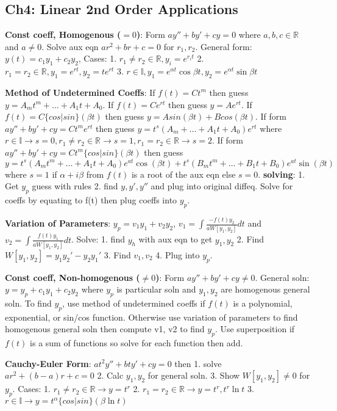\subsection*{Ch4: Linear 2nd Order Applications}

\textbf{Const coeff, Homogenous ($=0$)}:
Form $ay'' + by' + cy = 0$ where $a,b,c \in \mathbb{R}$ and $a \neq 0$. Solve aux eqn $ar^2 + br + c = 0$ for $r_1, r_2$.
General form: $y(t) = c_1 y_1 + c_2 y_2$, 
Cases: 
1. $r_1 \neq r_2 \in \mathbb{R}, y_i = e^{r_i t}$ 
2. $r_1 = r_2 \in \mathbb{R}, y_1 = e^{rt}, y_2 = te^{rt}$ 
3. $r \in \mathbb{I}, y_1 = e^{\alpha t}\cos{\beta t}, y_2 = e^{\alpha t}\sin{\beta t}$

\textbf{Method of Undetermined Coeffs}:
If $f(t) = Ct^m$ then guess $y = A_m t^m + \dots + A_1t + A_0$. 
If $f(t) = Ce^{rt}$ then guess $y = Ae^{rt}$. 
If $f(t) = C\{cos|sin\}(\beta t)$ then guess $y = Asin(\beta t) + Bcos(\beta t)$. 
If form $ay'' + by' + cy = Ct^me^{rt}$ then guess $y = t^s(A_m + \dots + A_1t + A_0)e^{rt}$ 
where $r \in \mathbb{I} \rightarrow s=0, r_1 \neq r_2 \in \mathbb{R} \rightarrow s=1, r_1 = r_2 \in \mathbb{R} \rightarrow s=2$.
If form $ay'' + by' + cy = Ct^m\{cos|sin\}(\beta t)$ then guess $y = t^s(A_m t^m + \dots + A_1t + A_0)e^{at}\cos(\beta t)
+ t^s(B_m t^m + \dots + B_1t + B_0)e^{at}\sin(\beta t)$ where $s=1$ if $\alpha + i \beta$ from $f(t)$ is a root of the aux eqn else $s=0$. \textbf{solving}:
1. Get $y_p$ guess with rules 2. find $y, y', y''$ and plug into original diffeq. Solve for coeffs by equating to f(t) then plug coeffs into $y_p$.

\textbf{Variation of Parameters}: 
$y_p = v_1 y_1 + v_2 y_2 $, $v_1 = \int \frac{-f(t) y_2}{aW[y_1, y_2]} dt$ and $v_2 = \int \frac{f(t) y_1}{aW[y_1, y_2]} dt$. 
Solve: 1. find $y_h$ with aux eqn to get $y_1, y_2$ 2. Find $W[y_1, y_2] = y_1 y_2' - y_2 y_1'$ 3. Find $v_1, v_2$ 4. Plug into $y_p$.

\textbf{Const coeff, Non-homogenous ($\neq 0$)}:
Form $ay'' + by' + cy \neq 0$. General soln: $y = y_p + c_1 y_1 + c_2 y_2$ where $y_p$ is particular soln and $y_1, y_2$ are homogenous general soln. 
To find $y_p$, use method of undetermined coeffs if $f(t)$ is a polynomial, exponential, or sin/cos function. Otherwise use variation of parameters to
find homogenous general soln then compute v1, v2 to find $y_p$. Use superposition if $f(t)$ is a sum of functions so solve for each function then add.

\textbf{Cauchy-Euler Form}: 
$at^2y'' + bty' + cy = 0$ then 1. solve $ar^2 + (b-a)r + c = 0$ 2. Calc $y_1, y_2$ for general soln. 3. Show $W[y_1,y_2] \neq 0$ for $y_p$. 
Cases: 1. $r_1 \neq r_2 \in \mathbb{R} \rightarrow y = t^r$ 
2. $r_1 = r_2 \in \mathbb{R} \rightarrow y = t^r, t^r\ln{t}$ 
3. $r \in \mathbb{I} \rightarrow y = t^{\alpha}\{cos|sin\}(\beta \ln{t})$

